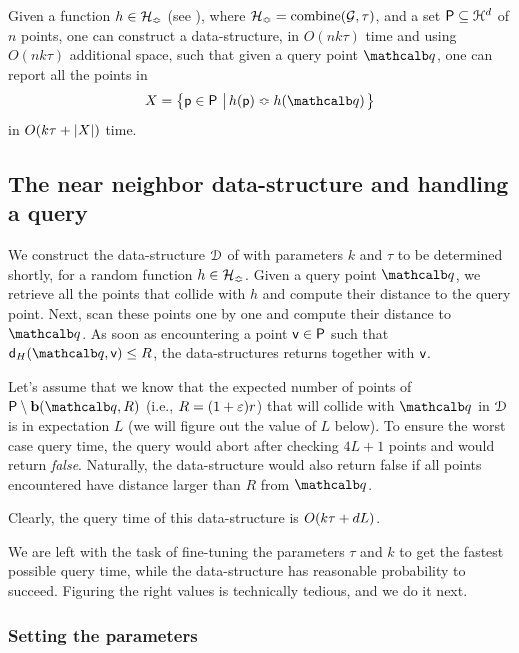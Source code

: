 \begin{lemma}    
    Given a function $h \in \mathcal{H}_{\Bumpeq}$ (see ),
    where $\FamilyAmp= \kFunctions{\FamilyB}{\tau}$, and a set
    ${\mathsf{P}} \subseteq \EuScript{H}^d$ of $n$ points, one can
    construct a data-structure, in $O(nk\tau)$ time and using
    $O(nk\tau)$ additional space, such that given a query point
    $\query$, one can report all the points in
    \[
    X = \brc{ \pnt \in \PntSet \sep{
          \WEqual{h(\pnt)}{h(\query)}}}
    \]
    in $O( k\tau + \left| {X} \right| )$ time.
\end{lemma}


\subsection{The near neighbor data-structure and handling a query}


We construct the data-structure $\EuScript{D}$ of  with
parameters $k$ and $\tau$ to be determined shortly, for a random
function $h \in \mathcal{H}_{\Bumpeq}$. Given a query point $\query$, we retrieve
all the points that collide with $h$ and compute their distance to the
query point. Next, scan these points one by one and compute their
distance to $\query$. As soon as encountering a point $\mathsf{v} \in
{\mathsf{P}}$ such that $\distH{\query}{\pntB} \leq R$, the data-structures
returns  together with $\mathsf{v}$. 

Let's assume that we know that the expected number of points of
$\PntSet \setminus \Ball(\query,R)$ (i.e., $R = (1+{\varepsilon})r$) that will
collide with $\query$ in $\EuScript{D}$ is in expectation $L$ (we will figure
out the value of $L$ below). To ensure the worst case query time, the
query would abort after checking $4L + 1$ points and would return
\emph{false}. Naturally, the data-structure would also return false if
all points encountered have distance larger than $R$ from $\query$.

Clearly, the query time of this data-structure is $O(k \tau + d
L)$.

We are left with the task of fine-tuning the parameters $\tau$ and $k$
to get the fastest possible query time, while the data-structure has
reasonable probability to succeed. Figuring the right values is
technically tedious, and we do it next.


\subsubsection{Setting the parameters}


